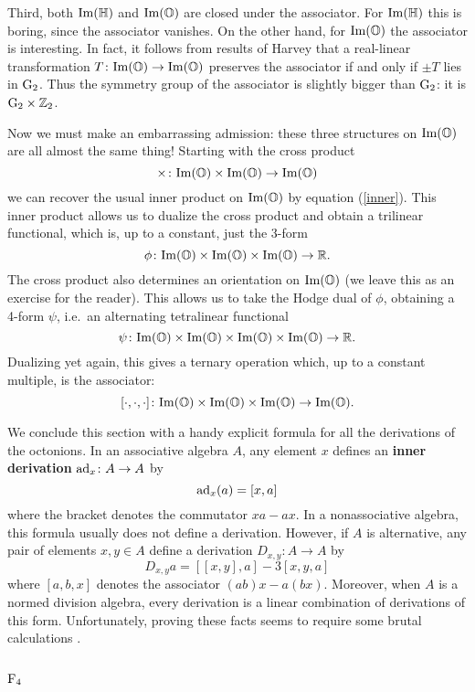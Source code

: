 \documentclass[12pt]{article}
\newcommand\Z{{\mathbb Z}}
\newcommand\R{{\mathbb R}}
\renewcommand\H{{\mathbb H}}
\renewcommand\O{{\mathbb O}}
\newcommand{\F}{{\rm F}}
\newcommand{\G}{{\rm G}}
\renewcommand{\Im}{{\rm Im}}
\newcommand{\be}{\begin{equation}}
\newcommand{\ee}{\end{equation}}
\newcommand{\ad}{{\rm ad}}
\newcommand{\maps}{\colon}
\begin{document}
Third, both $\Im(\H)$ and $\Im(\O)$ are closed under the associator.    
For $\Im(\H)$ this is boring, since the associator vanishes.  On  the  
other hand, for $\Im(\O)$ the associator is interesting.  In fact, it  
follows from results of Harvey \cite{Harvey} that a real-linear  
transformation $T \maps \Im(\O) \to \Im(\O)$ preserves the associator  
if and only if $\pm T$ lies in $\G_2$.  Thus the symmetry group of the
associator is slightly bigger than $\G_2$: it is $\G_2 \times \Z_2$.  
   
Now we must make an embarrassing admission: these three structures on  
$\Im(\O)$ are all almost the same thing!   Starting with the cross
product   
\[    \times \maps \Im(\O) \times \Im(\O) \to \Im(\O)  \]   
we can recover the usual inner product on $\Im(\O)$ by equation   
(\ref{inner}).  This inner product allows us to dualize the cross
product and obtain a trilinear functional, which is, up to a constant,   
just the 3-form    
\[     \phi \maps \Im(\O) \times \Im(\O) \times \Im(\O) \to \R .\]   
The cross product also determines an orientation on $\Im(\O)$ (we leave   
this as an exercise for the reader).  This allows us to take the Hodge   
dual of $\phi$, obtaining a 4-form $\psi$, i.e.\ an alternating   
tetralinear functional    
\[     \psi \maps \Im(\O) \times \Im(\O) \times \Im(\O) \times \Im(\O)   
\to \R .\]   
Dualizing yet again, this gives a ternary operation which, up   
to a constant multiple, is the associator:   
\[  [\cdot, \cdot, \cdot] \maps \Im(\O) \times \Im(\O) \times \Im(\O)    
\to \Im(\O) .\]   
   
We conclude this section with a handy explicit formula for all the   
derivations of the octonions.    In an associative algebra $A$, any   
element $x$ defines an {\bf inner derivation} $\ad_x \maps A \to A$ by   
\[      \ad_x (a) = [x,a]  \]   
where the bracket denotes the commutator $xa - ax$.   
In a nonassociative algebra, this formula usually does not define   
a derivation.  However, if $A$ is alternative, any pair of elements   
$x,y \in A$ define a derivation $D_{x,y} \maps A \to A$ by   
\be       D_{x,y} a = [[x,y],a] - 3[x,y,a]          \label{D}  \ee   
where $[a,b,x]$ denotes the associator $(ab)x - a(bx)$.   Moreover, 
when $A$ is a normed division algebra, every derivation is a linear 
combination of derivations of this form.  Unfortunately, proving these 
facts seems to require some brutal calculations \cite{Schafer}.  
   
\subsection{$\F_4$}   \label{F4}   
\end{document}
